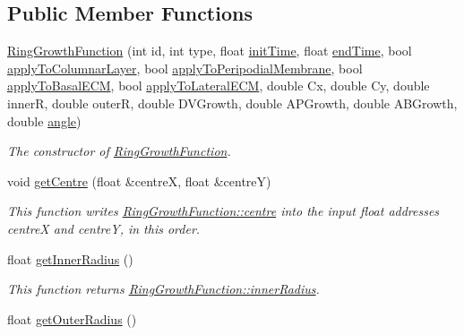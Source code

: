 \subsection*{Public Member Functions}
\begin{DoxyCompactItemize}
\item 
\hyperlink{classRingGrowthFunction_a6d4914efe62137aae9fec55401edf986}{Ring\+Growth\+Function} (int id, int type, float \hyperlink{classGrowthFunctionBase_ae92513a7b41637df8e26e7db35ddf97c}{init\+Time}, float \hyperlink{classGrowthFunctionBase_a3ff4db0573d354a75666a5f3ca446941}{end\+Time}, bool \hyperlink{classGrowthFunctionBase_a3d56771e7c145589a14e11cc331e0326}{apply\+To\+Columnar\+Layer}, bool \hyperlink{classGrowthFunctionBase_a08ae19f58cb98fa8e315a77f52749732}{apply\+To\+Peripodial\+Membrane}, bool \hyperlink{classGrowthFunctionBase_a9fe46fc6dde4041b79204beb48972a09}{apply\+To\+Basal\+E\+C\+M}, bool \hyperlink{classGrowthFunctionBase_ac623b1dbe376bce5dddbe1a2e21c776f}{apply\+To\+Lateral\+E\+C\+M}, double Cx, double Cy, double inner\+R, double outer\+R, double D\+V\+Growth, double A\+P\+Growth, double A\+B\+Growth, double \hyperlink{classRingGrowthFunction_add6283d1ad999925c4202a3fa66b76ea}{angle})
\begin{DoxyCompactList}\small\item\em The constructor of \hyperlink{classRingGrowthFunction}{Ring\+Growth\+Function}. \end{DoxyCompactList}\item 
\hypertarget{classRingGrowthFunction_aa2063170e3ee5c5f22d7beef32300e9c}{}void \hyperlink{classRingGrowthFunction_aa2063170e3ee5c5f22d7beef32300e9c}{get\+Centre} (float \&centre\+X, float \&centre\+Y)\label{classRingGrowthFunction_aa2063170e3ee5c5f22d7beef32300e9c}

\begin{DoxyCompactList}\small\item\em This function writes \hyperlink{classRingGrowthFunction_a5b8f1cc72d03907bb1492e6c2f288db0}{Ring\+Growth\+Function\+::centre} into the input float addresses centre\+X and centre\+Y, in this order. \end{DoxyCompactList}\item 
\hypertarget{classRingGrowthFunction_ae1f4f4cecfab3ec343c748cfe78ab70b}{}float \hyperlink{classRingGrowthFunction_ae1f4f4cecfab3ec343c748cfe78ab70b}{get\+Inner\+Radius} ()\label{classRingGrowthFunction_ae1f4f4cecfab3ec343c748cfe78ab70b}

\begin{DoxyCompactList}\small\item\em This function returns \hyperlink{classRingGrowthFunction_a4e8796fbbbe9fe18c2dcd04613effcf0}{Ring\+Growth\+Function\+::inner\+Radius}. \end{DoxyCompactList}\item 
\hypertarget{classRingGrowthFunction_ad5c890c72a8ce520411d28e929faec19}{}float \hyperlink{classRingGrowthFunction_ad5c890c72a8ce520411d28e929faec19}{get\+Outer\+Radius} ()\label{classRingGrowthFunction_ad5c890c72a8ce520411d28e929faec19}


\end{DoxyCompactItemize}
